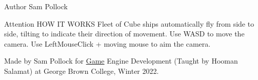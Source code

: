 \begin{DoxyAuthor}{Author}
Sam Pollock
\end{DoxyAuthor}
\begin{DoxyAttention}{Attention}
HOW IT WORKS Fleet of Cube ships automatically fly from side to side, tilting to indicate their direction of movement. Use WASD to move the camera. Use Left\+Mouse\+Click + moving mouse to aim the camera.
\end{DoxyAttention}
Made by Sam Pollock for \mbox{\hyperlink{class_game}{Game}} Engine Development (Taught by Hooman Salamat) at George Brown College, Winter 2022. 